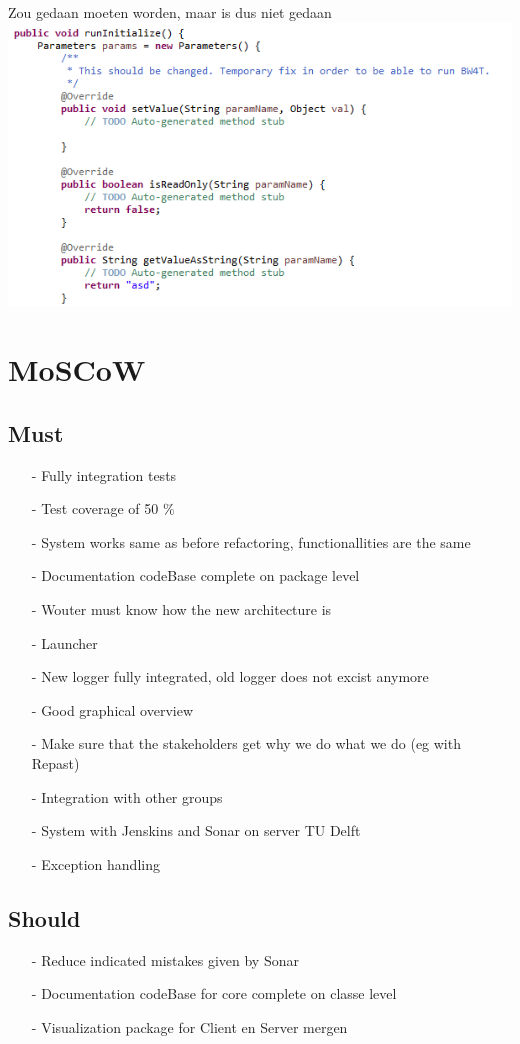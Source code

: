 \documentclass[11pt,a4paper]{article}
\begin{document}
Zou gedaan moeten worden, maar is dus niet gedaan \\
\includegraphics[width=\linewidth]{TODOs+shouldBeFixed} \\

\newpage
\section*{MoSCoW}
\subsection*{Must}
\begin{enumerate}
\item[-] Fully integration tests
\item[-] Test coverage of 50 $\%$
\item[-] System works same as before refactoring, functionallities are the same
\item[-] Documentation codeBase complete on package level
\item[-] Wouter must know how the new architecture is
\item[-] Launcher
\item[-] New logger fully integrated, old logger does not excist anymore
\item[-] Good graphical overview
\item[-] Make sure that the stakeholders get why we do what we do (eg with Repast)
\item[-] Integration with other groups
\item[-] System with Jenskins and Sonar on server TU Delft
\item[-] Exception handling
\end{enumerate}

\subsection*{Should}
\begin{enumerate}
\item[-] Reduce indicated mistakes given by Sonar
\item[-] Documentation codeBase for core complete on classe level
\item[-] Visualization package for Client en Server mergen
\end{enumerate}
\end{document}
